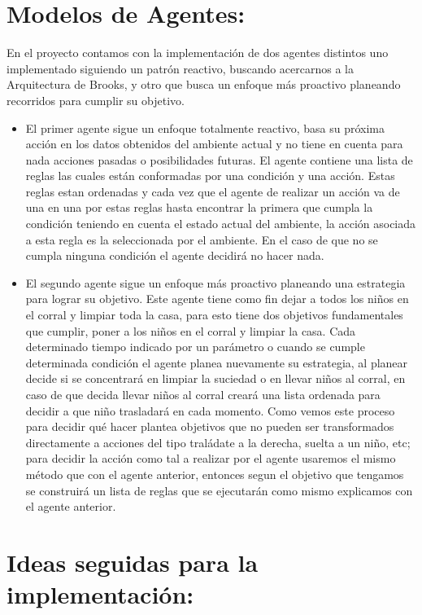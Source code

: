 \documentclass[12pt]{article}
\begin{document}
\section{Modelos de Agentes:}
En el proyecto contamos con la implementaci\'on de dos agentes distintos uno implementado siguiendo un patr\'on reactivo, buscando acercarnos a la Arquitectura de Brooks, y otro que busca un enfoque m\'as proactivo
planeando recorridos para cumplir su objetivo.
\begin{itemize}
	\item El primer agente sigue un enfoque totalmente reactivo, basa su pr\'oxima acci\'on en los datos obtenidos del ambiente actual y no tiene en cuenta para nada acciones pasadas o posibilidades futuras.
	El agente contiene una lista de reglas las cuales est\'an conformadas por una condici\'on y una acci\'on. Estas reglas estan ordenadas y cada vez que el agente de realizar un acci\'on va de una en una por estas reglas
	hasta encontrar la primera que cumpla la condici\'on teniendo en cuenta el estado actual del ambiente, la acci\'on asociada a esta regla es la seleccionada por el ambiente. En el caso de que no se cumpla ninguna condici\'on el 
	agente decidir\'a no hacer nada. 

	\item El segundo agente sigue un enfoque m\'as proactivo planeando una estrategia para lograr su objetivo. Este agente tiene como fin dejar a todos los ni\~nos en el corral y limpiar toda la casa, para esto tiene dos objetivos fundamentales
	que cumplir, poner a los ni\~nos en el corral y limpiar la casa. Cada determinado tiempo indicado por un par\'ametro o cuando se cumple determinada condici\'on el agente planea nuevamente su estrategia, al planear decide si se concentrar\'a en 
	limpiar la suciedad o en llevar ni\~nos al corral, en caso de que decida llevar ni\~nos al corral crear\'a una lista ordenada para decidir a que ni\~no trasladar\'a en cada momento. Como vemos este proceso para decidir qu\'e hacer plantea objetivos que no pueden 
	ser transformados directamente a acciones del tipo tral\'adate a la derecha, suelta a un ni\~no, etc; para decidir la acci\'on como tal a realizar por el agente usaremos el mismo m\'etodo que con el agente anterior, entonces segun el objetivo que tengamos
	se construir\'a un lista de reglas que se ejecutar\'an como mismo explicamos con el agente anterior.
	
\end{itemize}

\section{Ideas seguidas para la implementaci\'on:}
\end{document}
